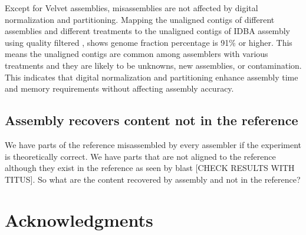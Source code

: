 Except for Velvet assemblies, misassemblies are not affected by digital normalization and partitioning. 
Mapping the unaligned  contigs of different assemblies and different treatments to the unaligned contigs of  IDBA  assembly using quality filtered , shows genome fraction percentage is 91\% or higher. This means the unaligned contigs are common among assemblers with various treatments and they are likely to be unknowns, new assemblies, or contamination. This indicates that digital normalization and partitioning enhance assembly time and memory requirements without affecting assembly accuracy.  

\subsection*{Assembly recovers content not in the reference } 
We have parts of the reference misassembled by every assembler if the experiment is theoretically correct. 
We have parts that are not aligned to the reference although they exist in the reference as seen by blast [CHECK RESULTS WITH TITUS]. 
So what are the content recovered by assembly and not in the reference?


  

\section*{Acknowledgments}



%
%
% 





